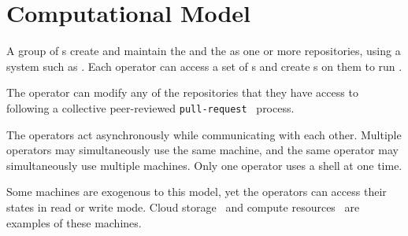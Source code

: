 \section{Computational Model}\label{computation_model}

A group of s create and maintain the  and the  as one or more repositories, using a system such as . Each operator can access a set of s and create s on them to run . 



The operator can modify any of the repositories that they have access to following a collective peer-reviewed \texttt{pull-request}~\cite{pull_request} process.

The operators act asynchronously while communicating with each other. Multiple operators may simultaneously use the same machine, and the same operator may simultaneously use multiple machines. Only one operator uses a shell at one time. 

Some machines are exogenous to this model, yet the operators can access their states in read or write mode. Cloud storage~\cite{aws_s3} and compute resources~\cite{aws_batch} are examples of these machines.

